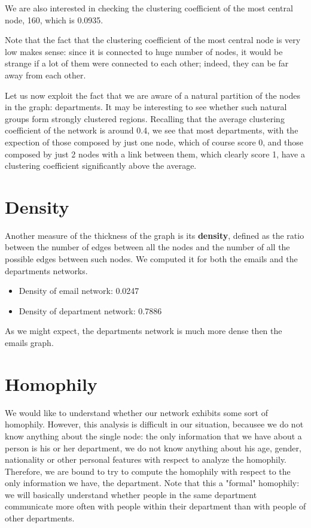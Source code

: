 \documentclass{report}
\theoremstyle{definition}
\theoremstyle{remark}
\begin{document}
We are also interested in checking the clustering coefficient of the most central node, 160, which is 0.0935.  


Note that the fact that the clustering coefficient of the most central node is very low makes sense: since it is connected to huge number of nodes, it would be strange if a lot of them were connected to each other; indeed, they can be far away from each other.

Let us now exploit the fact that we are aware of a natural partition of the nodes in the graph: departments. It may be interesting to see whether such natural groups form strongly clustered regions. Recalling that the average clustering coefficient of the network is around 0.4, we see that most departments, with the expection of those composed by just one node, which of course score 0, and those composed by just 2 nodes with a link between them, which clearly score 1, have a clustering coefficient significantly above the average.\\
\section*{Density}
Another measure of the thickness of the graph is its \textbf{density}, defined as the ratio between the number of edges between all the nodes and the number of all the possible edges between such nodes. We computed it for both the emails and the departments networks.
\begin{itemize}
	\item Density of email network: 0.0247
	\item Density of department network: 0.7886
\end{itemize}
As we might expect, the departments network is much more dense then the emails graph.
\section*{Homophily}
We would like to understand whether our network exhibits some sort of homophily. However, this analysis is difficult in our situation, becausee we do not know anything about the single node: the only information that we have about a person is his or her department, we do not know anything about his age, gender, nationality or other personal features with respect to analyze the homophily. Therefore, we are bound to try to compute the homophily with respect to the only information we have, the department. Note that this a "formal" homophily: we will basically understand whether people in the same department communicate more often with people within their department than with people of other departments.
\end{document}
